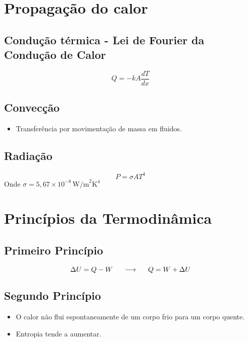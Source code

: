 \documentclass[a4paper,12pt]{article}
\begin{document}
\begin{multicols}{2}
\section{Propagação do calor}
\subsection{Condução térmica -  Lei de Fourier da Condução de Calor}
\begin{equation}
\boxed{Q = -kA\frac{dT}{dx}}
\end{equation}

\subsection{Convecção}
\begin{itemize}
    \item Transferência por movimentação de massa em fluidos.
\end{itemize}

\subsection{Radiação}
\begin{equation}
    P = \sigma A T^4
\end{equation}
Onde $\sigma = 5{,}67 \times 10^{-8} \, \text{W/m}^2\text{K}^4$

\section{Princ\'ipios da Termodinâmica}

\subsection{Primeiro Princípio}
\begin{equation}
    \Delta U = Q - W   \hspace{0.5cm} \longrightarrow \hspace{0.5cm} Q = W + \Delta U
\end{equation}
\subsection{Segundo Princípio}
\begin{itemize}
    \item O calor não flui espontaneamente de um corpo frio para um corpo quente.
    \item Entropia tende a aumentar.
\end{itemize}

\end{multicols}
\end{document}
